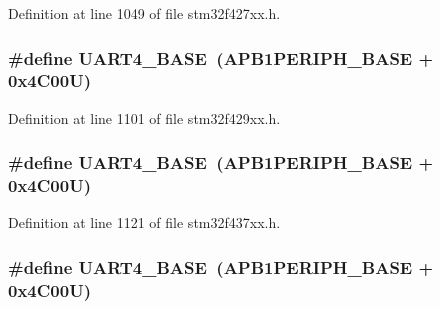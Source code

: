 Definition at line 1049 of file stm32f427xx.\+h.

\subsubsection[{\texorpdfstring{U\+A\+R\+T4\+\_\+\+B\+A\+SE}{UART4_BASE}}]{\setlength{\rightskip}{0pt plus 5cm}\#define U\+A\+R\+T4\+\_\+\+B\+A\+SE~({\bf A\+P\+B1\+P\+E\+R\+I\+P\+H\+\_\+\+B\+A\+SE} + 0x4\+C00\+U)}\hypertarget{group___peripheral__memory__map_ga94d92270bf587ccdc3a37a5bb5d20467}{}\label{group___peripheral__memory__map_ga94d92270bf587ccdc3a37a5bb5d20467}


Definition at line 1101 of file stm32f429xx.\+h.

\subsubsection[{\texorpdfstring{U\+A\+R\+T4\+\_\+\+B\+A\+SE}{UART4_BASE}}]{\setlength{\rightskip}{0pt plus 5cm}\#define U\+A\+R\+T4\+\_\+\+B\+A\+SE~({\bf A\+P\+B1\+P\+E\+R\+I\+P\+H\+\_\+\+B\+A\+SE} + 0x4\+C00\+U)}\hypertarget{group___peripheral__memory__map_ga94d92270bf587ccdc3a37a5bb5d20467}{}\label{group___peripheral__memory__map_ga94d92270bf587ccdc3a37a5bb5d20467}


Definition at line 1121 of file stm32f437xx.\+h.

\subsubsection[{\texorpdfstring{U\+A\+R\+T4\+\_\+\+B\+A\+SE}{UART4_BASE}}]{\setlength{\rightskip}{0pt plus 5cm}\#define U\+A\+R\+T4\+\_\+\+B\+A\+SE~({\bf A\+P\+B1\+P\+E\+R\+I\+P\+H\+\_\+\+B\+A\+SE} + 0x4\+C00\+U)}\hypertarget{group___peripheral__memory__map_ga94d92270bf587ccdc3a37a5bb5d20467}{}\label{group___peripheral__memory__map_ga94d92270bf587ccdc3a37a5bb5d20467}


